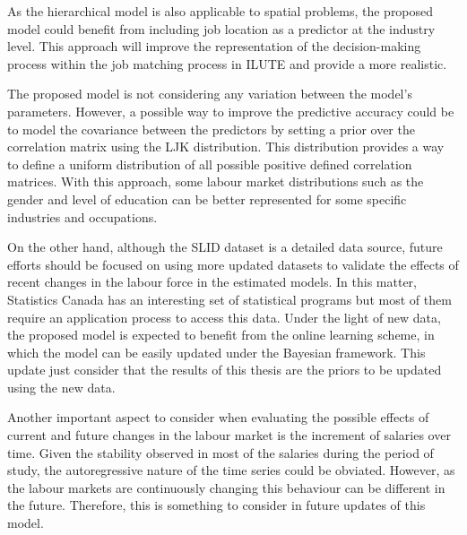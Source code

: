 As the hierarchical model is also applicable to spatial problems, the proposed model could benefit from including job location as a predictor at the industry level. This approach will improve the representation of the decision-making process within the job matching process in ILUTE and provide a more realistic. 

The proposed model is not considering any variation between the model's parameters. However, a possible way to improve the predictive accuracy could be to model the covariance between the predictors by setting a prior over the correlation matrix using the LJK distribution. This distribution provides a way to define a uniform distribution of all possible positive defined correlation matrices. With this approach, some labour market distributions such as the gender and level of education can be better represented for some specific industries and occupations. 

On the other hand, although the SLID dataset is a detailed data source, future efforts should be focused on using more updated datasets to validate the effects of recent changes in the labour force in the estimated models. In this matter, Statistics Canada has an interesting set of statistical programs but most of them require an application process to access this data. Under the light of new data, the proposed model is expected to benefit from the online learning scheme, in which the model can be easily updated under the Bayesian framework. This update just consider that the results of this thesis are the priors to be updated using the new data. 

Another important aspect to consider when evaluating the possible effects of current and future changes in the labour market is the increment of salaries over time. Given the stability observed in most of the salaries during the period of study, the autoregressive nature of the time series could be obviated. However, as the labour markets are continuously changing this behaviour can be different in the future. Therefore, this is something to consider in future updates of this model. 